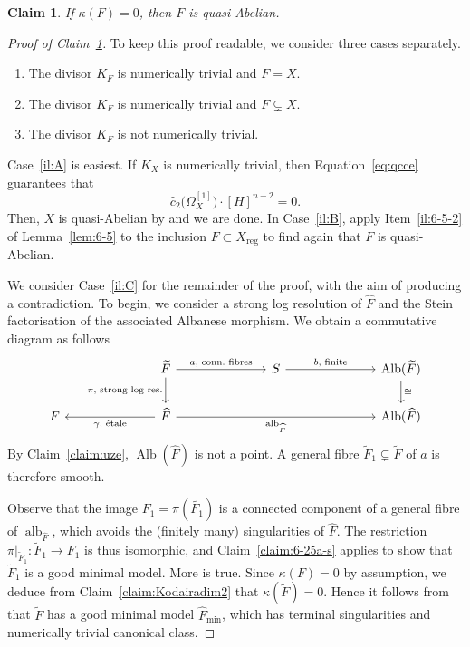 \documentclass[JEP,XML,SOM,Unicode,published]{cedram}
\let\ts\relax
\newenvironment{enumeraten}
{\begin{enumerate}\setcounter{enumi}{\value{equation}}\itemindent0pt}
{\setcounter{equation}{\value{enumi}}\end{enumerate}}
\theoremstyle{plain}
\newtheorem{claim}[thm]{Claim}
\theoremstyle{definition}
\numberwithin{equation}{thm}
\numberwithin{enumi}{thm}
\newcommand{\reg}{\mathrm{reg}}
\DeclareMathOperator{\alb}{alb}
\DeclareMathOperator{\Alb}{Alb}
\let\wtilde\widetilde
\let\what\widehat
\begin{document}
\begin{claim}\label{claim:solvK0}
If $\kappa(F)=0$, then $F$ is quasi-Abelian.
\end{claim}
\begin{proof}[Proof of Claim~\ref{claim:solvK0}]
To keep this proof readable, we consider three cases separately.
\begin{enumeraten}
\item\label{il:A} The divisor $K_F$ is numerically trivial and $F = X$.

\item\label{il:B} The divisor $K_F$ is numerically trivial and $F \subsetneq X$.

\item\label{il:C} The divisor $K_F$ is not numerically trivial.
\end{enumeraten}
Case~\ref{il:A} is easiest. If $K_X$ is numerically trivial, then
Equation~\eqref{eq:qcce} guarantees that
\[
\what{c}_2 \bigl(\Omega^{[1]}_X \bigr)\cdot [H]^{n-2} = 0.
\]
Then, $X$ is quasi-Abelian by \cite[Th.\,1.2]{LT18} and we are done. In
Case~\ref{il:B}, apply Item~\ref{il:6-5-2} of Lemma~\ref{lem:6-5} to the
inclusion $F \subset X_{\reg}$ to find again that $F$ is quasi-Abelian.

We consider Case~\ref{il:C} for the remainder of the proof, with the aim of
producing a contradiction. To begin, we consider a strong log resolution of
$\what{F}$ and the Stein factorisation of the associated Albanese morphism.
We obtain a commutative diagram as follows
\[
\begin{tikzcd}[column sep=2.5cm]
& \wtilde{F} \ar[r, "\ts a\text{, conn.~fibres}"] \ar[d, "\ts\pi\text{, strong log res.}"'] & S \ar[r, "\ts b\text{, finite}"] & \Alb(\wtilde{F}) \ar[d, "\ts\cong"] \\
F & \what{F} \ar[rr, "\ts \alb_{\what{F}}"'] \ar[l, "\ts\gamma\text{, étale}"] && \Alb(\what{F})
\end{tikzcd}
\]
By Claim~\ref{claim:uze}, $\Alb(\what{F})$ is not a point. A general fibre
$\wtilde{F}_1 \subsetneq \wtilde{F}$ of $a$ is therefore smooth.

Observe that the image $F_1 = \pi(\wtilde{F_1})$ is a connected component of a
general fibre of $\alb_{\what{F}}$, which avoids the (finitely many)
singularities of $\what{F}$. The restriction
\hbox{$\pi|_{\wtilde{F}_1} : \wtilde{F}_1 \to F_1$} is thus isomorphic, and
Claim~\ref{claim:6-25a-s} applies to show that $\wtilde{F}_1$ is a good
minimal model. More is true. Since $\kappa (F) = 0$ by assumption, we deduce from
Claim~\ref{claim:Kodairadim2} that $\kappa(\wtilde{F}) = 0$. Hence it follows from
\cite[Th.\,4.2]{Lai11} that $\wtilde{F}$ has a good minimal model
$\what{F}_{\min}$, which has terminal singularities and numerically trivial
canonical class.


\end{proof}
\end{document}
